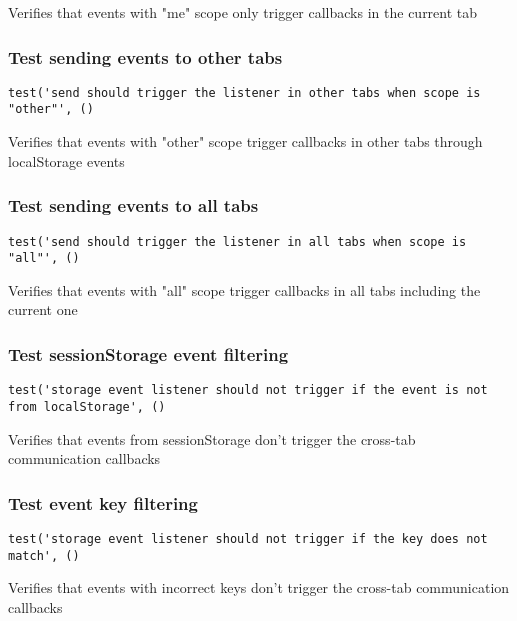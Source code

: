 \documentclass[a4paper]{article}
\begin{document}
Verifies that events with "me" scope only trigger callbacks
in the current tab

\hypertarget{toc296}{}
\subsubsection{Test sending events to other tabs}

\begin{lstlisting}
test('send should trigger the listener in other tabs when scope is "other"', ()
\end{lstlisting}

Verifies that events with "other" scope trigger callbacks
in other tabs through localStorage events

\hypertarget{toc297}{}
\subsubsection{Test sending events to all tabs}

\begin{lstlisting}
test('send should trigger the listener in all tabs when scope is "all"', ()
\end{lstlisting}

Verifies that events with "all" scope trigger callbacks
in all tabs including the current one

\hypertarget{toc298}{}
\subsubsection{Test sessionStorage event filtering}

\begin{lstlisting}
test('storage event listener should not trigger if the event is not from localStorage', ()
\end{lstlisting}

Verifies that events from sessionStorage don't trigger
the cross-tab communication callbacks

\hypertarget{toc299}{}
\subsubsection{Test event key filtering}

\begin{lstlisting}
test('storage event listener should not trigger if the key does not match', ()
\end{lstlisting}

Verifies that events with incorrect keys don't trigger
the cross-tab communication callbacks
\end{document}
